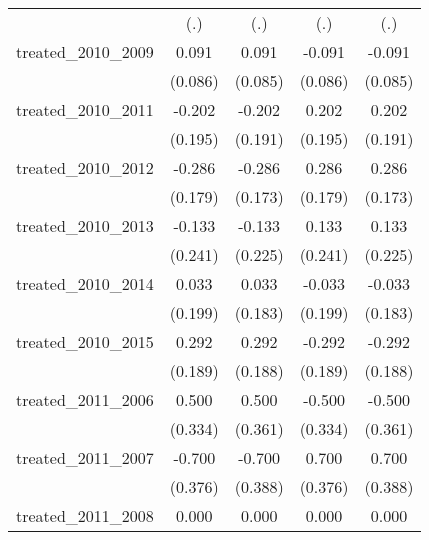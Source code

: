 {\begin{tabular}{l*{4}{c}}
            &         (.)         &         (.)         &         (.)         &         (.)         \\
[1em]
treated\_2010\_2009&       0.091         &       0.091         &      -0.091         &      -0.091         \\
            &     (0.086)         &     (0.085)         &     (0.086)         &     (0.085)         \\
[1em]
treated\_2010\_2011&      -0.202         &      -0.202         &       0.202         &       0.202         \\
            &     (0.195)         &     (0.191)         &     (0.195)         &     (0.191)         \\
[1em]
treated\_2010\_2012&      -0.286         &      -0.286         &       0.286         &       0.286         \\
            &     (0.179)         &     (0.173)         &     (0.179)         &     (0.173)         \\
[1em]
treated\_2010\_2013&      -0.133         &      -0.133         &       0.133         &       0.133         \\
            &     (0.241)         &     (0.225)         &     (0.241)         &     (0.225)         \\
[1em]
treated\_2010\_2014&       0.033         &       0.033         &      -0.033         &      -0.033         \\
            &     (0.199)         &     (0.183)         &     (0.199)         &     (0.183)         \\
[1em]
treated\_2010\_2015&       0.292         &       0.292         &      -0.292         &      -0.292         \\
            &     (0.189)         &     (0.188)         &     (0.189)         &     (0.188)         \\
[1em]
treated\_2011\_2006&       0.500         &       0.500         &      -0.500         &      -0.500         \\
            &     (0.334)         &     (0.361)         &     (0.334)         &     (0.361)         \\
[1em]
treated\_2011\_2007&      -0.700         &      -0.700         &       0.700         &       0.700         \\
            &     (0.376)         &     (0.388)         &     (0.376)         &     (0.388)         \\
[1em]
treated\_2011\_2008&       0.000         &       0.000         &       0.000         &       0.000         \\

\end{tabular}}
